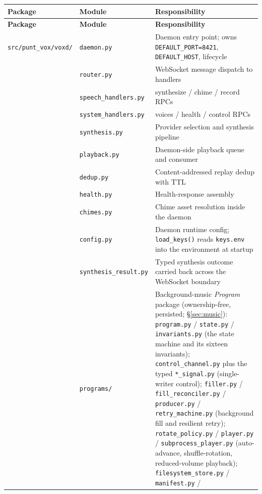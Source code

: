 \documentclass[a4paper,10pt]{article}
\newcommand{\modpath}[1]{\texttt{src/punt\_vox/#1}}
\begin{document}
\begin{center}
\begin{longtable}{llp{7cm}}
\toprule
\textbf{Package} & \textbf{Module} & \textbf{Responsibility} \\
\midrule
\endfirsthead
\toprule
\textbf{Package} & \textbf{Module} & \textbf{Responsibility} \\
\midrule
\endhead
\modpath{voxd/} & \texttt{daemon.py} & Daemon entry point; owns
             \texttt{DEFAULT\_PORT=8421}, \texttt{DEFAULT\_HOST}, lifecycle \\
        & \texttt{router.py} & WebSocket message dispatch to handlers \\
        & \texttt{speech\_handlers.py} & synthesize / chime / record RPCs \\
        & \texttt{system\_handlers.py} & voices / health / control RPCs \\
        & \texttt{synthesis.py} & Provider selection and synthesis pipeline \\
        & \texttt{playback.py} & Daemon-side playback queue and consumer \\
        & \texttt{dedup.py} & Content-addressed replay dedup with TTL \\
        & \texttt{health.py} & Health-response assembly \\
        & \texttt{chimes.py} & Chime asset resolution inside the daemon \\
        & \texttt{config.py} & Daemon runtime config; \texttt{load\_keys()}
             reads \texttt{keys.env} into the environment at startup \\
        & \texttt{synthesis\_result.py} & Typed synthesis outcome carried
             back across the WebSocket boundary \\
        & \texttt{programs/} & Background-music \emph{Program} package
             (ownership-free, persisted; \S\ref{sec:music}):
             \texttt{program.py} / \texttt{state.py} / \texttt{invariants.py}
             (the state machine and its sixteen invariants);
             \texttt{control\_channel.py} plus the typed
             \texttt{*\_signal.py} (single-writer control);
             \texttt{filler.py} / \texttt{fill\_reconciler.py} /
             \texttt{producer.py} / \texttt{retry\_machine.py} (background
             fill and resilient retry); \texttt{rotate\_policy.py} /
             \texttt{player.py} / \texttt{subprocess\_player.py}
             (auto-advance, shuffle-rotation, reduced-volume playback);
             \texttt{filesystem\_store.py} / \texttt{manifest.py} /

\end{longtable}
\end{center}
\end{document}
